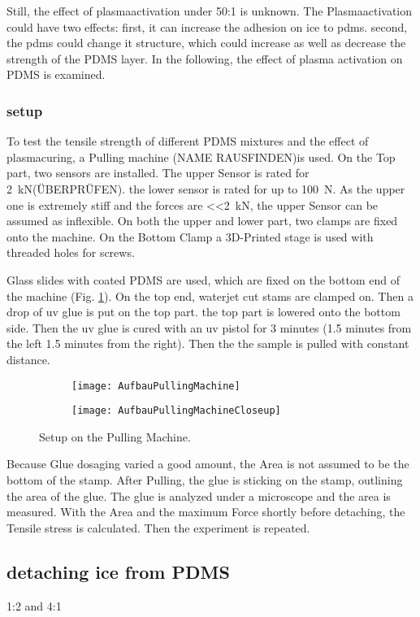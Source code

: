 Still, the effect of plasmaactivation under 50:1 is unknown. The Plasmaactivation could have two effects: first, it can increase the adhesion on ice to pdms. second, the pdms could change it structure, which could increase as well as decrease the strength of the PDMS layer. In the following, the effect of plasma activation on PDMS is examined.

\subsubsection{setup}

To test the tensile strength of different PDMS mixtures and the effect of plasmacuring, a Pulling machine (NAME RAUSFINDEN)is used. 
On the Top part, two sensors are installed. The upper Sensor is rated for \SI{2}{\kilo\newton}(ÜBERPRÜFEN). the lower sensor is rated for up to \SI{100}{\newton}. As the upper one is extremely stiff and the forces are \SI{<<2}{\kilo\newton}, the upper Sensor can be assumed as inflexible. On both the upper and lower part, two clamps are fixed onto the machine. On the Bottom Clamp a 3D-Printed stage is used with threaded holes for screws. 

Glass slides with coated PDMS are used, which are fixed on the bottom end of the machine (Fig. \ref{fig:PullingMachineSetup}). On the top end, waterjet cut stams are clamped on. Then a drop of uv glue is put on the top part. the top part is lowered onto the bottom side. Then the uv glue is cured with an uv pistol for 3 minutes (1.5 minutes from the left 1.5 minutes from the right). Then the the sample is pulled with constant distance.

\begin{figure}[hbt!]
	\centering
	\begin{subfigure}[]{0.45\textwidth}
		\centering
		\texttt{[image: AufbauPullingMachine]}
		\caption{}
	\end{subfigure}
	\begin{subfigure}[]{0.45\textwidth}
		\centering
		\texttt{[image: AufbauPullingMachineCloseup]}
		\caption{}
	\end{subfigure}
	\caption{Setup on the Pulling Machine.}
	\label{fig:PullingMachineSetup}
\end{figure}

Because Glue dosaging varied a good amount, the Area is not assumed to be the bottom of the stamp. After Pulling, the glue is sticking on the stamp, outlining the area of the glue. The glue is analyzed under a microscope and the area is measured. With the Area and the maximum Force shortly before detaching, the Tensile stress is calculated. Then the experiment is repeated.



\subsection{detaching ice from PDMS}

1:2 and 4:1

